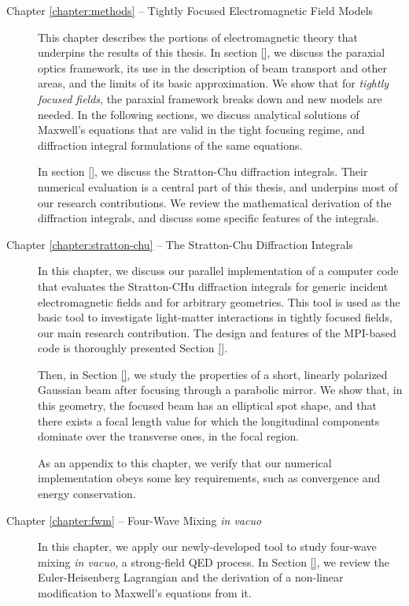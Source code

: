 \documentclass[11pt,SymmetricalJury]{inrsthesis/inrsthesis}
\begin{document}
\begin{description}
  \item [Chapter \ref{chapter:methods} -- Tightly Focused Electromagnetic Field Models]
  This chapter describes the portions of electromagnetic theory that underpins
  the results of this thesis. In section \ref{}, we discuss the paraxial optics
  framework, its use in the description of beam transport and other areas, and
  the limits of its basic approximation. We show that for \textit{tightly focused fields},
  the paraxial framework breaks down and new models are needed. In the following sections,
  we discuss analytical solutions of Maxwell's equations that are valid in the tight
  focusing regime, and diffraction integral formulations of the same equations.

  In section \ref{}, we discuss the Stratton-Chu diffraction integrals. Their
  numerical evaluation is a central part of this thesis, and underpins most of
  our research contributions. We review the mathematical derivation of the
  diffraction integrals, and discuss some specific features of the integrals.

  \item [Chapter \ref{chapter:stratton-chu} -- The Stratton-Chu Diffraction Integrals]
  In this chapter, we discuss our parallel implementation of a computer code that
  evaluates the Stratton-CHu diffraction integrals for generic incident
  electromagnetic fields and for arbitrary geometries. This tool is used as the
  basic tool to investigate light-matter interactions in tightly focused fields,
  our main research contribution. The design and features
  of the MPI-based code is thoroughly presented Section \ref{}.

  Then, in Section
  \ref{}, we study the properties of a short, linearly polarized Gaussian beam
  after focusing through a parabolic mirror. We show that, in this geometry,
  the focused beam has an elliptical spot shape, and that there exists a focal
  length value for which the longitudinal components dominate over the transverse
  ones, in the focal region.

  As an appendix to this chapter, we verify that our numerical implementation
  obeys some key requirements, such as convergence and energy conservation.

  \item [Chapter \ref{chapter:fwm} -- Four-Wave Mixing \textit{in vacuo}]
  In this chapter, we apply our newly-developed tool to study four-wave mixing
  \textit{in vacuo}, a strong-field QED process. In Section \ref{}, we review
  the Euler-Heisenberg Lagrangian and the derivation of a non-linear modification
  to Maxwell's equations from it.


\end{description}
\end{document}
